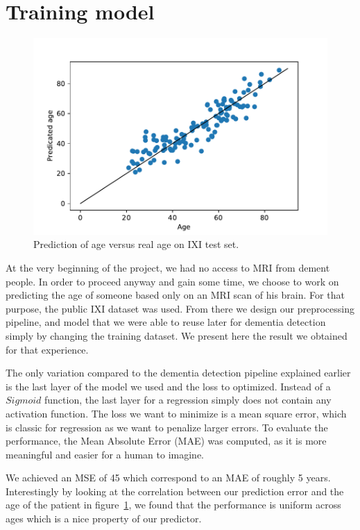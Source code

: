 \section{Training model}

\begin{figure}
 \centering
 \includegraphics[width=.9\linewidth]{figures/Age_pred_vs_age_IXI.pdf}
 \captionsetup{width=.9\linewidth}
 \caption{Prediction of age versus real age on IXI test set.}
 \label{fig:IXI_pred_vs_age}
\end{figure}

At the very beginning of the project, we had no access to MRI from dement people. In order to proceed anyway and gain some time, we choose to work on predicting the age of someone based only on an MRI scan of his brain. For that purpose, the public IXI dataset was used. From there we design our preprocessing pipeline, and model that we were able to reuse later for dementia detection simply by changing the training dataset. We present here the result we obtained for that experience.

The only variation compared to the dementia detection pipeline explained earlier is the last layer of the model we used and the loss to optimized. Instead of a $Sigmoid$ function, the last layer for a regression simply does not contain any activation function. The loss we want to minimize is a mean square error, which is classic for regression as we want to penalize larger errors. To evaluate the performance, the Mean Absolute Error (MAE) was computed, as it is more meaningful and easier for a human to imagine.


We achieved an MSE of 45 which correspond to an MAE of roughly 5 years. Interestingly by looking at the correlation between our prediction error and the age of the patient in figure~\ref{fig:IXI_pred_vs_age}, we found that the performance is uniform across ages which is a nice property of our predictor.

